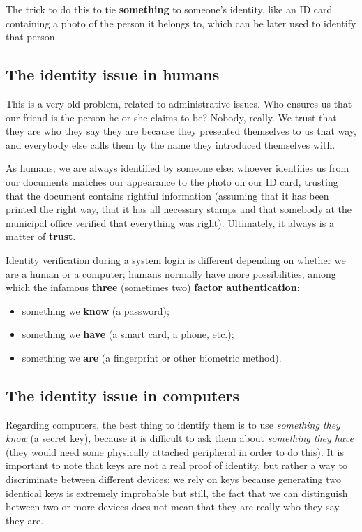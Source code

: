 The trick to do this to tie \textbf{something} to someone's identity, like an ID card containing a photo of the person it belongs to, which can be later used to identify that person.


\subsection*{The identity issue in humans}
This is a very old problem, related to administrative issues. Who ensures us that our friend is the person he or she claims to be? Nobody, really. We trust that they are who they say they are because they presented themselves to us that way, and everybody else calls them by the name they introduced themselves with.

As humans, we are always identified by someone else: whoever identifies us from our documents matches our appearance to the photo on our ID card, trusting that the document contains rightful information (assuming that it has been printed the right way, that it has all necessary stamps and that somebody at the municipal office verified that everything was right). Ultimately, it always is a matter of \textbf{trust}.

Identity verification during a system login is different depending on whether we are a human or a computer; humans normally have more possibilities, among which the infamous \textbf{three} (sometimes two) \textbf{factor authentication}:

\begin{itemize}
    \item something we \textbf{know} (a password);
    \item something we \textbf{have} (a smart card, a phone, etc.);
    \item something we \textbf{are} (a fingerprint or other biometric method).
\end{itemize}


\subsection*{The identity issue in computers}
Regarding computers, the best thing to identify them is to use \textit{something they know} (a secret key), because it is difficult to ask them about \textit{something they have} (they would need some physically attached peripheral in order to do this). It is important to note that keys are not a real proof of identity, but rather a way to discriminate between different devices; we rely on keys because generating two identical keys is extremely improbable but still, the fact that we can distinguish between two or more devices does not mean that they are really who they say they are.

